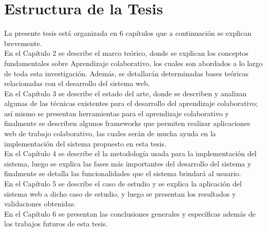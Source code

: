 \section{Estructura de la Tesis}
La presente tesis está organizada en 6 capítulos que a continuación se explican brevemente.\\

En el Capítulo 2 se describe el marco teórico, donde se explican los conceptos fundamentales sobre Aprendizaje colaborativo, los cuales son abordados a lo largo de toda esta investigación. Además, se detallarán determinadas bases teóricas relacionadas con el desarrollo del sistema web.\\

En el Capítulo 3 se describe el estado del arte, donde se describen y analizan algunas de las técnicas existentes para el desarrollo del aprendizaje colaborativo; así mismo se presentan herramientas para el aprendizaje colaborativo y finalmente se describen algunos frameworks que permiten realizar aplicaciones web de trabajo colaborativo, las cuales serán de mucha ayuda en la implementación del sistema propuesto en esta tesis.\\

En el Capítulo 4 se describe el la metodología usada para la implementación del sistema, luego se explica las fases más importantes del desarrollo del sistema y finalmente se detalla las funcionalidades que el sistema brindará al usuario.\\

En el Capítulo 5 se describe el caso de estudio y se explica la aplicación del sistema web a dicho caso de estudio, y luego se presentan los resultados y validaciones obtenidas.\\

En el Capítulo 6 se presentan las conclusiones generales y específicas además de los trabajos futuros de esta tesis.


